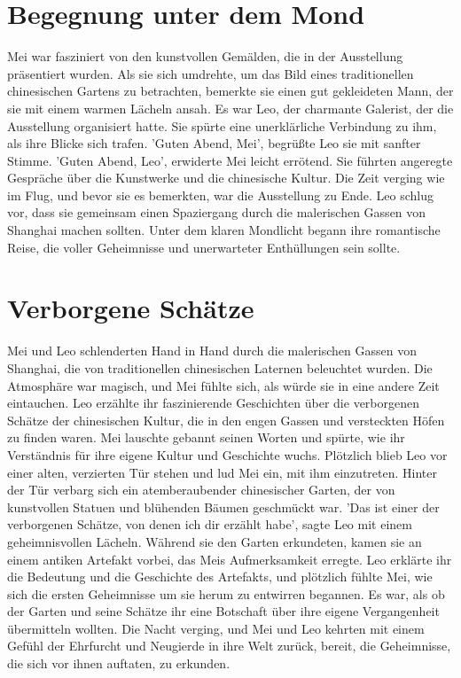 \documentclass[12pt]{article} %
\begin{document}
\clearpage
\tableofcontents
\clearpage


\section{ Begegnung unter dem Mond }
\begin{minipage}{\textwidth}
    Mei war fasziniert von den kunstvollen Gemälden, die in der Ausstellung präsentiert wurden. Als sie sich umdrehte, um das Bild eines traditionellen chinesischen Gartens zu betrachten, bemerkte sie einen gut gekleideten Mann, der sie mit einem warmen Lächeln ansah. Es war Leo, der charmante Galerist, der die Ausstellung organisiert hatte. Sie spürte eine unerklärliche Verbindung zu ihm, als ihre Blicke sich trafen. 'Guten Abend, Mei', begrüßte Leo sie mit sanfter Stimme. 'Guten Abend, Leo', erwiderte Mei leicht errötend. Sie führten angeregte Gespräche über die Kunstwerke und die chinesische Kultur. Die Zeit verging wie im Flug, und bevor sie es bemerkten, war die Ausstellung zu Ende. Leo schlug vor, dass sie gemeinsam einen Spaziergang durch die malerischen Gassen von Shanghai machen sollten. Unter dem klaren Mondlicht begann ihre romantische Reise, die voller Geheimnisse und unerwarteter Enthüllungen sein sollte.
\end{minipage}

\section{ Verborgene Schätze }
\begin{minipage}{\textwidth}
    Mei und Leo schlenderten Hand in Hand durch die malerischen Gassen von Shanghai, die von traditionellen chinesischen Laternen beleuchtet wurden. Die Atmosphäre war magisch, und Mei fühlte sich, als würde sie in eine andere Zeit eintauchen. Leo erzählte ihr faszinierende Geschichten über die verborgenen Schätze der chinesischen Kultur, die in den engen Gassen und versteckten Höfen zu finden waren. Mei lauschte gebannt seinen Worten und spürte, wie ihr Verständnis für ihre eigene Kultur und Geschichte wuchs. Plötzlich blieb Leo vor einer alten, verzierten Tür stehen und lud Mei ein, mit ihm einzutreten. Hinter der Tür verbarg sich ein atemberaubender chinesischer Garten, der von kunstvollen Statuen und blühenden Bäumen geschmückt war. 'Das ist einer der verborgenen Schätze, von denen ich dir erzählt habe', sagte Leo mit einem geheimnisvollen Lächeln. Während sie den Garten erkundeten, kamen sie an einem antiken Artefakt vorbei, das Meis Aufmerksamkeit erregte. Leo erklärte ihr die Bedeutung und die Geschichte des Artefakts, und plötzlich fühlte Mei, wie sich die ersten Geheimnisse um sie herum zu entwirren begannen. Es war, als ob der Garten und seine Schätze ihr eine Botschaft über ihre eigene Vergangenheit übermitteln wollten. Die Nacht verging, und Mei und Leo kehrten mit einem Gefühl der Ehrfurcht und Neugierde in ihre Welt zurück, bereit, die Geheimnisse, die sich vor ihnen auftaten, zu erkunden.
\end{minipage}
\end{document}
